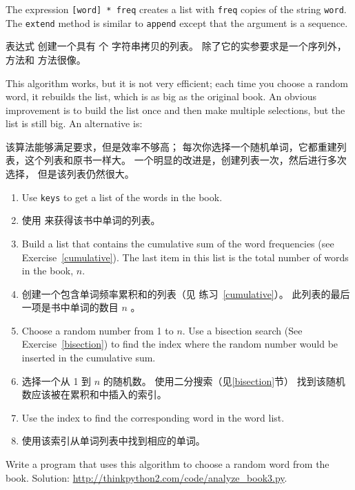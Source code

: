 %
The expression {\tt [word] * freq} creates a list with {\tt freq}
copies of the string {\tt word}.  The {\tt extend}
method is similar to {\tt append} except that the argument is
a sequence.

表达式  创建一个具有  个  字符串拷贝的列表。
除了它的实参要求是一个序列外， 方法和  方法很像。

This algorithm works, but it is not very efficient; each time you
choose a random word, it rebuilds the list, which is as big as
the original book.  An obvious improvement is to build the list
once and then make multiple selections, but the list is still big.
An alternative is:

该算法能够满足要求，但是效率不够高；
每次你选择一个随机单词，它都重建列表，这个列表和原书一样大。
一个明显的改进是，创建列表一次，然后进行多次选择， 但是该列表仍然很大。

\begin{enumerate}
\item Use {\tt keys} to get a list of the words in the book.

\item 使用  来获得该书中单词的列表。

\item Build a list that contains the cumulative sum of the word
  frequencies (see Exercise~\ref{cumulative}).  The last item
  in this list is the total number of words in the book, $n$.

\item 创建一个包含单词频率累积和的列表（见 练习~\ref{cumulative}）。  此列表的最后一项是书中单词的数目 $n$ 。

\item Choose a random number from 1 to $n$.  Use a bisection search
  (See Exercise~\ref{bisection}) to find the index where the random
  number would be inserted in the cumulative sum.

\item 选择一个从 1 到 $n$ 的随机数。 使用二分搜索（见\ref{bisection}节）  找到该随机数应该被在累积和中插入的索引。

\item Use the index to find the corresponding word in the word list.

\item 使用该索引从单词列表中找到相应的单词。
\end{enumerate}

\begin{exercise}
\label{randhist}
Write a program that uses this algorithm to choose a random word from
the book.  Solution:
\url{http://thinkpython2.com/code/analyze_book3.py}.
\end{exercise}


